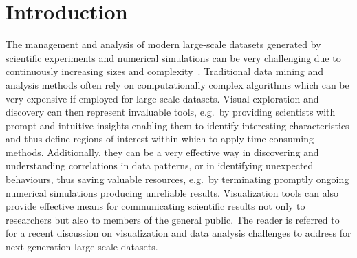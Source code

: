 \documentclass[smallextended]{svjour3}
\begin{document}
\section{Introduction}
\label{sec:intro}

The management and analysis of modern large-scale datasets generated by scientific experiments and numerical simulations can be very challenging due to continuously increasing sizes and complexity~\cite{DataTsunami}. Traditional data mining and analysis methods often rely on computationally complex
algorithms which can be very expensive if employed for 
large-scale datasets. Visual exploration and discovery can then represent invaluable tools, e.g.\ by providing scientists with prompt and intuitive insights enabling them to identify interesting characteristics and thus define regions of interest within which
to apply time-consuming methods. Additionally, they can be a very effective way in discovering and understanding correlations in data patterns, or in identifying unexpected behaviours, thus saving valuable resources, e.g.\ by terminating promptly ongoing numerical simulations producing unreliable results. Visualization tools can also provide effective means for communicating scientific results not only to researchers but also to members of the general public. The reader is referred to~\cite{DataAnalysisVisualization} for a recent discussion on visualization and data analysis challenges to address for next-generation large-scale datasets.
\end{document}
